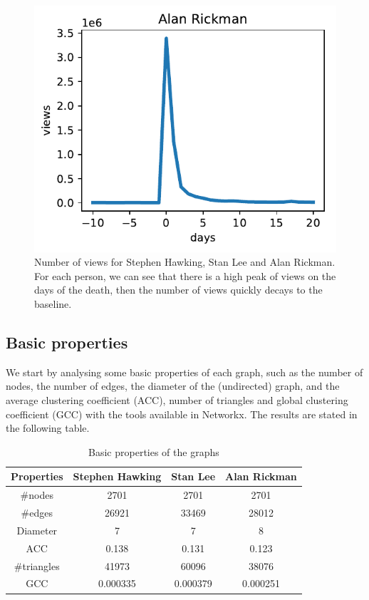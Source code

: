 \documentclass[conference]{IEEEtran}
\begin{document}
\begin{figure}[!htb]
  \includegraphics[width=\linewidth]{viewsAR.pdf}
\endminipage
\caption{Number of views for Stephen Hawking, Stan Lee and Alan Rickman. For each person, we can see that there is a high peak of views on the days of the death, then the number of views quickly decays to the baseline.  }
\end{figure}

\subsection{Basic properties}
We start by analysing some basic properties of each graph, such as the number of nodes, the number of edges, the diameter of the (undirected) graph, and the average clustering coefficient (ACC), number of triangles and global clustering coefficient (GCC) with the tools available in Networkx. The results are stated in the  following table. 


\begin{table}[htbp]
\caption{Basic properties of the graphs}
\begin{center}
\begin{tabular}{|c|c|c|c|}
\hline
 Properties & \textbf{Stephen Hawking}& \textbf{Stan Lee}& \textbf{Alan Rickman} \\
\hline
$\#$nodes& 2701 &  2701 & 2701 \\
\hline
$\#$edges & 26921 & 33469 & 28012  \\
\hline
Diameter & 7 & 7 &  8\\
\hline
ACC & 0.138 & 0.131 &  0.123\\
\hline
$\#$triangles  & 41973 & 60096 & 38076  \\
\hline
GCC & 0.000335 & 0.000379 & 0.000251 \\
\hline
\end{tabular}
\end{center}
\end{table}
\end{document}
